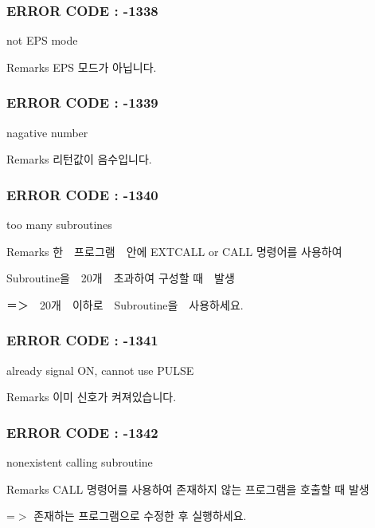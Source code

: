  \subsubsection*{E\-R\-R\-O\-R C\-O\-D\-E \-: -\/1338 }

not E\-P\-S mode \begin{DoxyRemark}{Remarks}
E\-P\-S 모드가 아닙니다.
\end{DoxyRemark}


 \subsubsection*{E\-R\-R\-O\-R C\-O\-D\-E \-: -\/1339 }

nagative number \begin{DoxyRemark}{Remarks}
리턴값이 음수입니다.
\end{DoxyRemark}


 \subsubsection*{E\-R\-R\-O\-R C\-O\-D\-E \-: -\/1340 }

too many subroutines \begin{DoxyRemark}{Remarks}
한　프로그램　안에 E\-X\-T\-C\-A\-L\-L or C\-A\-L\-L 명령어를 사용하여 \par
 Subroutine을　20개　초과하여 구성할 때　발생 \par
 ＝＞　20개　이하로　\-Subroutine을　사용하세요.
\end{DoxyRemark}


 \subsubsection*{E\-R\-R\-O\-R C\-O\-D\-E \-: -\/1341 }

already signal O\-N, cannot use P\-U\-L\-S\-E \begin{DoxyRemark}{Remarks}
이미 신호가 켜져있습니다.
\end{DoxyRemark}


 \subsubsection*{E\-R\-R\-O\-R C\-O\-D\-E \-: -\/1342 }

nonexistent calling subroutine \begin{DoxyRemark}{Remarks}
C\-A\-L\-L 명령어를 사용하여 존재하지 않는 프로그램을 호출할 때 발생 \par
 =$>$ 존재하는 프로그램으로 수정한 후 실행하세요.
\end{DoxyRemark}


